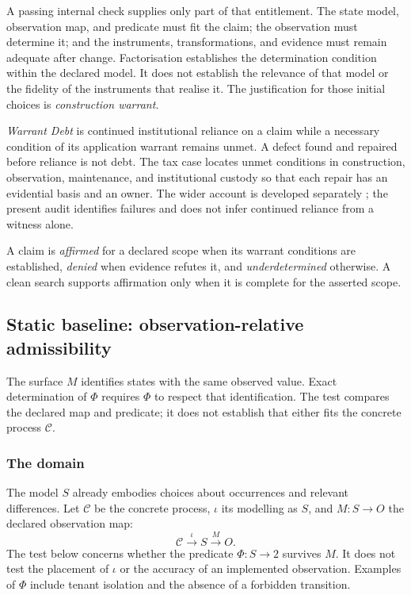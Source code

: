 \documentclass[twocolumn,envcountsect,envcountsame,natbib]{svjour3}
\begin{document}
A passing internal check supplies only part of that entitlement. The state model, observation map, and predicate must fit the claim; the observation must determine it; and the instruments, transformations, and evidence must remain adequate after change. Factorisation establishes the determination condition within the declared model. It does not establish the relevance of that model or the fidelity of the instruments that realise it. The justification for those initial choices is \emph{construction warrant}.

\emph{Warrant Debt} is continued institutional reliance on a claim while a necessary condition of its application warrant remains unmet. A defect found and repaired before reliance is not debt. The tax case locates unmet conditions in construction, observation, maintenance, and institutional custody so that each repair has an evidential basis and an owner. The wider account is developed separately \citep{moore2026exactness}; the present audit identifies failures and does not infer continued reliance from a witness alone.

A claim is \emph{affirmed} for a declared scope when its warrant conditions are established, \emph{denied} when evidence refutes it, and \emph{underdetermined} otherwise. A clean search supports affirmation only when it is complete for the asserted scope.

\subsection{Static baseline: observation-relative admissibility}\label{ex:sec:test}

The surface $M$ identifies states with the same observed value. Exact determination of $\Phi$ requires $\Phi$ to respect that identification. The test compares the declared map and predicate; it does not establish that either fits the concrete process $\mathcal{C}$.

\subsubsection{The domain}

The model $S$ already embodies choices about occurrences and relevant differences. Let $\mathcal{C}$ be the concrete process, $\iota$ its modelling as $S$, and $M:S\to O$ the declared observation map:
\[
\mathcal{C} \overset{\iota}{\longrightarrow} S \overset{M}{\longrightarrow} O.
\]
The test below concerns whether the predicate $\Phi:S\to 2$ survives $M$. It does not test the placement of $\iota$ or the accuracy of an implemented observation. Examples of $\Phi$ include tenant isolation and the absence of a forbidden transition.
\end{document}
